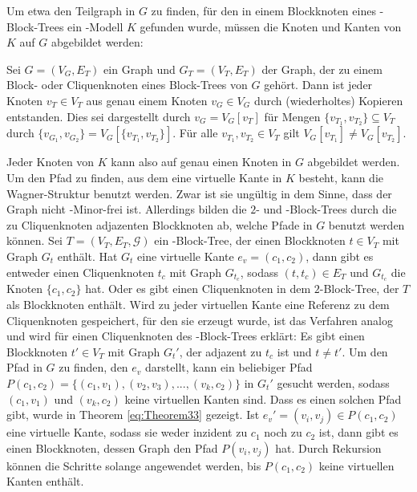 Um etwa den Teilgraph in $G$ zu finden, für den in einem Blockknoten eines \dd-Block-Trees ein \kf-Modell $K$ gefunden wurde, müssen die Knoten und Kanten von $K$ auf $G$ abgebildet werden:
\begin{definition}
  Sei $G = (V_G, E_T)$ ein Graph und $G_T = (V_T, E_T)$ der Graph, der zu einem Block- oder Cliquenknoten eines Block-Trees von $G$ gehört.
  Dann ist jeder Knoten $v_T \in V_T$ aus genau einem Knoten $v_G \in V_G$ durch (wiederholtes) Kopieren entstanden.
  Dies sei dargestellt durch $v_G = V_G[v_T]$ \bzw für Mengen $\{v_{T_1}, v_{T_2}\} \subseteq V_T$ durch $\{v_{G_1}, v_{G_2}\} = V_G[\{v_{T_1}, v_{T_2}\}]$.
  Für alle $v_{T_1}, v_{T_2} \in V_T$ gilt $V_G[v_{T_1}] \neq V_G[v_{T_2}]$.
\end{definition}
Jeder Knoten von $K$ kann also auf genau einen Knoten in $G$ abgebildet werden.
Um den Pfad zu finden, aus dem eine virtuelle Kante in $K$ besteht, kann die Wagner-Struktur benutzt werden.
Zwar ist sie ungültig in dem Sinne, dass der Graph nicht \kf-Minor-frei ist.
Allerdings bilden die $2$- und \dd-Block-Trees durch die zu Cliquenknoten adjazenten Blockknoten ab, welche Pfade in $G$ benutzt werden können.
Sei $T = (V_T, E_T, \mathcal{G})$ ein \dd-Block-Tree, der einen Blockknoten $t \in V_T$ mit Graph $G_t$ enthält.
Hat $G_t$ eine virtuelle Kante $e_v = (c_1, c_2)$, dann gibt es entweder einen Cliquenknoten $t_c$ mit Graph $G_{t_c}$, sodass $(t, t_c) \in E_T$ und $G_{t_c}$ die Knoten $\{c_1, c_2\}$ hat.
Oder es gibt einen Cliquenknoten in dem $2$-Block-Tree, der $T$ als Blockknoten enthält.
Wird zu jeder virtuellen Kante eine Referenz zu dem Cliquenknoten gespeichert, für den sie erzeugt wurde, ist das Verfahren analog und wird für einen Cliquenknoten des \dd-Block-Trees erklärt:
Es gibt einen Blockknoten $t' \in V_T$ mit Graph $G_t'$, der adjazent zu $t_c$ ist und $t \neq t'$.
Um den Pfad in $G$ zu finden, den $e_v$ darstellt, kann ein beliebiger Pfad $P(c_1, c_2) = \{(c_1, v_1), (v_2, v_3), ..., (v_k, c_2)\}$ in $G_t'$ gesucht werden, sodass $(c_1, v_1)$ und $(v_k, c_2)$ keine virtuellen Kanten sind.
Dass es einen solchen Pfad gibt, wurde in Theorem \ref{eq:Theorem33} gezeigt.
Ist $e_v' = (v_i, v_j) \in P(c_1, c_2)$ eine virtuelle Kante, sodass sie weder inzident zu $c_1$ noch zu $c_2$ ist, dann gibt es einen Blockknoten, dessen Graph den Pfad $P(v_i, v_j)$ hat.
Durch Rekursion können die Schritte solange angewendet werden, bis $P(c_1, c_2)$ keine virtuellen Kanten enthält.


